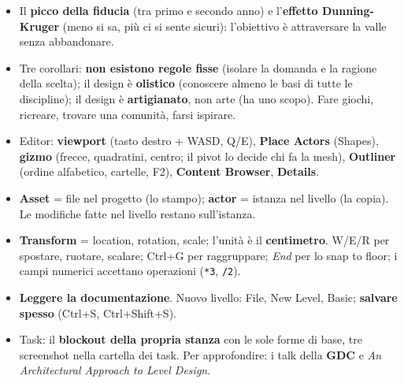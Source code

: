 \begin{itemize}
        un elemento distinguibile e visibile da lontano che aiuta a
        orientarsi; anche rifiutarlo dev'essere una scelta consapevole),
        \textbf{pratica}, \textbf{expertise}, \textbf{esperienza sul campo},
        \textbf{lavoro di gruppo}. E soprattutto pratica.
  \item Il \textbf{picco della fiducia} (tra primo e secondo anno) e
        l'\textbf{effetto Dunning-Kruger} (meno si sa, più ci si sente
        sicuri): l'obiettivo è attraversare la valle senza abbandonare.
  \item Tre corollari: \textbf{non esistono regole fisse} (isolare la
        domanda e la ragione della scelta); il design è \textbf{olistico}
        (conoscere almeno le basi di tutte le discipline); il design è
        \textbf{artigianato}, non arte (ha uno scopo). Fare giochi, ricreare,
        trovare una comunità, farsi ispirare.
  \item Editor: \textbf{viewport} (tasto destro + WASD, Q/E), \textbf{Place
        Actors} (Shapes), \textbf{gizmo} (frecce, quadratini, centro; il
        pivot lo decide chi fa la mesh), \textbf{Outliner} (ordine
        alfabetico, cartelle, F2), \textbf{Content Browser}, \textbf{Details}.
  \item \textbf{Asset} = file nel progetto (lo stampo); \textbf{actor} =
        istanza nel livello (la copia). Le modifiche fatte nel livello restano
        sull'istanza.
  \item \textbf{Transform} = location, rotation, scale; l'unità è il
        \textbf{centimetro}. W/E/R per spostare, ruotare, scalare; Ctrl+G per
        raggruppare; \emph{End} per lo snap to floor; i campi numerici
        accettano operazioni (\texttt{*3}, \texttt{/2}).
  \item \textbf{Leggere la documentazione}. Nuovo livello: File, New Level,
        Basic; \textbf{salvare spesso} (Ctrl+S, Ctrl+Shift+S).
  \item Task: il \textbf{blockout della propria stanza} con le sole forme di
        base, tre screenshot nella cartella dei task. Per approfondire: i talk
        della \textbf{GDC} e \emph{An Architectural Approach to Level Design}.
\end{itemize}
